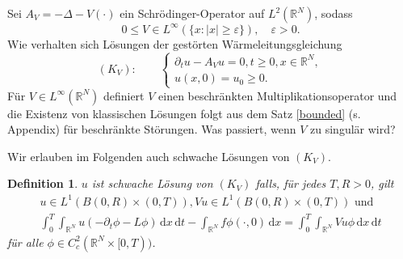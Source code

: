 \documentclass{beamer}
\newtheorem{df}[thm]{Definition}
\theoremstyle{break}
\begin{document}
\begin{frame}
Sei $A_V= -\Delta - V(\cdot)$ ein Schr\"odinger-Operator auf $L^2(\mathbb R^N)$, sodass
\begin{equation}
0\le V\in L^\infty(\{x:|x|\ge \varepsilon\}), \quad \varepsilon >0.
\end{equation}\label{perturbed}
\pause
Wie verhalten sich L\"osungen der gest\"orten W\"armeleitungsgleichung 
\begin{equation}
(K_V): \qquad \begin{cases}
\partial_t u - A_V u =0, t\ge 0, x\in \mathbb R^N,\\
u(x,0)=u_0 \ge 0.
\end{cases}
\end{equation}
\pause
F\"ur $V\in L^\infty(\mathbb R^N)$ definiert $V$ einen beschr\"ankten Multiplikationsoperator und die Existenz von klassischen L\"osungen folgt aus dem Satz \ref{bounded} (s. Appendix) f\"ur beschr\"ankte St\"orungen. %
Was passiert, wenn $V$ zu singul\"ar wird?
\end{frame}

\begin{frame}
Wir erlauben im Folgenden auch schwache L\"osungen von $(K_V)$. \vspace{.25cm}
\begin{df}
$u$ ist schwache L\"osung von $(K_V)$ falls, f\"ur jedes $T, R>0$, gilt
\begin{gather}\label{weak}
u\in L^1(B(0,R) \times (0,T)), Vu \in L^1(B(0,R)\times (0,T)) \text{ und }\\
\int_0^T \int_{\mathbb R^N} u (-\partial_t \phi - L\phi) \, \mathrm dx \, \mathrm dt - \int_{\mathbb R^N} f \phi(\cdot, 0) \, \mathrm dx = \int_0^T \int_{\mathbb R^N} V u \phi \, \mathrm dx \, \mathrm dt
\end{gather}
f\"ur alle $\phi \in C_c^2(\mathbb R^N\times [0,T))$.
\end{df}
\end{frame}
\end{document}
